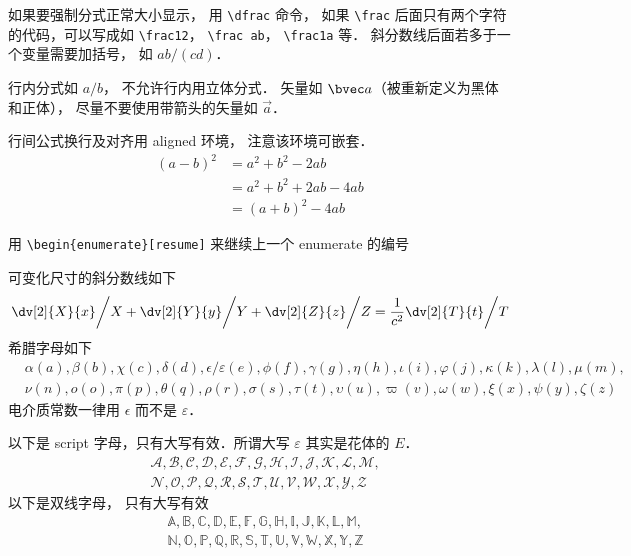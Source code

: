 如果要强制分式正常大小显示， 用 \lstinline|\dfrac| 命令， 如果 \lstinline|\frac| 后面只有两个字符的代码，可以写成如 \lstinline|\frac12|， \lstinline|\frac ab|， \lstinline|\frac1a| 等． 斜分数线后面若多于一个变量需要加括号， 如 $ab/(cd)$．

行内分式如 $a/b$， 不允许行内用立体分式． 矢量如 $\bvec a$（被重新定义为黑体和正体）， 尽量不要使用带箭头的矢量如 $\vec a$． 

行间公式换行及对齐用 aligned 环境， 注意该环境可嵌套．
\begin{equation}
\begin{aligned}
(a-b)^2 &= a^2+b^2 - 2ab \\
& = a^2+b^2+2ab-4ab\\
& = (a+b)^2-4ab
\end{aligned}
\end{equation}

用 \lstinline|\begin{enumerate}[resume]|  来继续上一个 enumerate 的编号

可变化尺寸的斜分数线如下
\begin{equation}
\left. \dv[2]{X}{x} \middle/ X + \dv[2]{Y}{y} \middle/ Y + \dv[2]{Z}{z} \middle/ Z  = \frac{1}{c^2}  \dv[2]{T}{t} \middle/ T\right.
\end{equation}
希腊字母如下
\begin{equation}
\begin{aligned}
&\alpha (a), \beta (b), \chi (c), \delta (d), \epsilon/\varepsilon (e), \phi (f), \gamma (g),
\eta (h), \iota (i), \varphi (j), \kappa (k), \lambda (l), \mu (m),\\
& \nu (n), o (o), \pi (p), \theta (q), \rho (r), \sigma (s), \tau (t), \upsilon (u), \varpi (v), \omega (w), \xi (x), \psi (y), \zeta (z)
\end{aligned}
\end{equation}
电介质常数一律用 $\epsilon$ 而不是 $\varepsilon$．

以下是 script 字母，只有大写有效．所谓大写 $\varepsilon$ 其实是花体的 $E$． 
\begin{equation}
\begin{aligned}
&\mathcal{A, B, C, D, E, F, G, H, I, J, K, L, M,}\\
&\mathcal{N, O, P, Q, R, S, T, U, V, W, X, Y, Z}
\end{aligned}
\end{equation}
以下是双线字母， 只有大写有效
\begin{equation}
\begin{aligned}
&\mathbb{A, B, C, D, E, F, G, H, I, J, K, L, M,}\\
&\mathbb{N, O, P, Q, R, S, T, U, V, W, X, Y, Z}
\end{aligned}
\end{equation}


